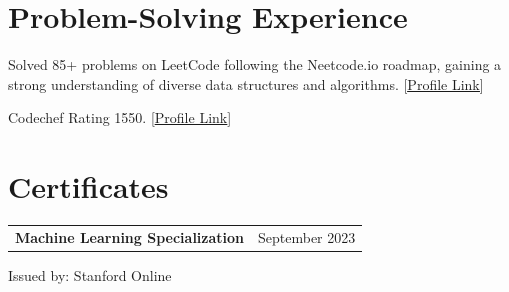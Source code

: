 \documentclass[letterpaper,11pt]{article}
\makeatletter
\newcommand{\resumeSubheading}[2]{
  \item
    \begin{tabularx}{0.97\textwidth}[t]{l@{\extracolsep{\fill}}r}
      \textbf{#1} & \small#2 \\
    \end{tabularx}
}
\newcommand{\resumeItem}[1]{\item\small #1}
\makeatother
\begin{document}
\section{Problem-Solving Experience}
    \begin{resumeItemList}
        \resumeItem{Solved 85+ problems on LeetCode following the Neetcode.io roadmap, gaining a strong understanding of diverse data structures and algorithms. [\href{https://leetcode.com/u/abrar-nazib/}{\underline{Profile Link}}]}
        \resumeItem{Codechef Rating 1550. [\href{https://codechef.com/users/abrarnazib}{\underline{Profile Link}}]}
    \end{resumeItemList}

\section{Certificates}
    \begin{resumeSubHeadingList}
        \resumeSubheading
          {Machine Learning Specialization}{September 2023}
          {Issued by: Stanford Online}{}
    \end{resumeSubHeadingList}

\end{document}
